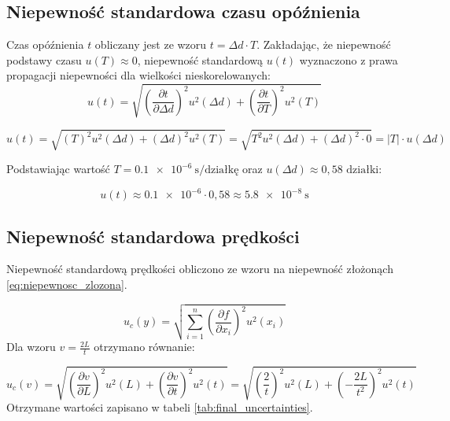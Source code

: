 \documentclass[a4paper,12pt]{article}
\begin{document}
\subsection{Niepewność standardowa czasu opóźnienia}

Czas opóźnienia \( t \) obliczany jest ze wzoru \( t = \Delta d \cdot T \). Zakładając, że niepewność podstawy czasu \( u(T) \approx 0 \), niepewność standardową \( u(t) \) wyznaczono z prawa propagacji niepewności dla wielkości nieskorelowanych:
$$
    u(t) = \sqrt{ \left(\frac{\partial t}{\partial \Delta d}\right)^2 u^2(\Delta d) + \left(\frac{\partial t}{\partial T}\right)^2 u^2(T) }
$$

$$
    u(t) = \sqrt{ \left( T \right)^2 u^2(\Delta d) + \left( \Delta d \right)^2 u^2(T) }
    =  \sqrt{ T^2 u^2(\Delta d) + (\Delta d)^2 \cdot 0 } = |T| \cdot u(\Delta d)
$$

Podstawiając wartość \( T = \SI{0.1e-6}{\second/\text{działkę}} \) oraz \( u(\Delta d) \approx 0{,}58 \text{ działki} \):

$$
    u(t) \approx \num{0.1e-6} \cdot 0{,}58  \approx \SI{5.8e-8}{\second}
$$

\subsection{Niepewność standardowa prędkości}

Niepewność standardową prędkości obliczono ze wzoru na niepewność złożonąch \eqref{eq:niepewnosc_zlozona}.

\begin{equation}
    \label{eq:niepewnosc_zlozona}
    u_c(y) = \sqrt{ \sum_{i=1}^{n} \left(\frac{\partial f}{\partial x_i}\right)^2 u^2(x_i) }
\end{equation}
Dla wzoru $v = \frac{2L}{t}$ otrzymano równanie:

\begin{equation*}
    u_c(v) = \sqrt{ \left(\frac{\partial v}{\partial L}\right)^2 u^2(L) + \left(\frac{\partial v}{\partial t}\right)^2 u^2(t) } = \sqrt{ \left(\frac{2}{t}\right)^2 u^2(L) + \left(-\frac{2L}{t^2}\right)^2 u^2(t) }
\end{equation*}
Otrzymane wartości zapisano w tabeli \ref{tab:final_uncertainties}.
\end{document}
